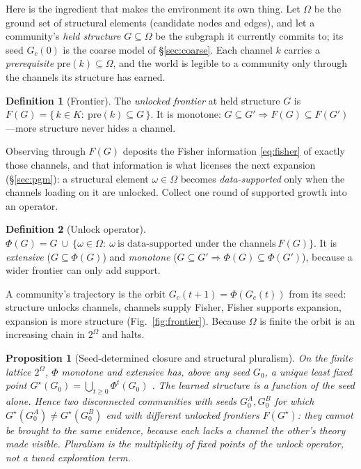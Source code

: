 \documentclass[11pt]{article}
\newcommand{\Prereq}{\mathrm{pre}}
\theoremstyle{definition}
\newtheorem{definition}{Definition}
\theoremstyle{plain}
\newtheorem{proposition}{Proposition}
\begin{document}
Here is the ingredient that makes the environment its own thing. Let $\Omega$ be the ground set of
structural elements (candidate nodes and edges), and let a community's \emph{held structure}
$G\subseteq\Omega$ be the subgraph it currently commits to; its seed $G_c(0)$ is the coarse model of
\S\ref{sec:coarse}. Each channel $k$ carries a \emph{prerequisite} $\Prereq(k)\subseteq\Omega$, and
the world is legible to a community only through the channels its structure has earned.

\begin{definition}[Frontier]
The \emph{unlocked frontier} at held structure $G$ is
$F(G)=\{\,k\in K:\ \Prereq(k)\subseteq G\,\}$. It is monotone: $G\subseteq G'\Rightarrow F(G)\subseteq
F(G')$---more structure never hides a channel.
\end{definition}

\noindent Observing through $F(G)$ deposits the Fisher information \eqref{eq:fisher} of exactly those
channels, and that information is what licenses the next expansion (\S\ref{sec:pgm}): a structural
element $\omega\in\Omega$ becomes \emph{data-supported} only when the channels loading on it are
unlocked. Collect one round of supported growth into an operator.

\begin{definition}[Unlock operator]
$\displaystyle \Phi(G)=G\ \cup\ \big\{\omega\in\Omega:\ \omega\ \text{is data-supported under the
channels}\ F(G)\big\}.$ It is \emph{extensive} ($G\subseteq\Phi(G)$) and \emph{monotone}
($G\subseteq G'\Rightarrow\Phi(G)\subseteq\Phi(G')$), because a wider frontier can only add support.
\end{definition}

A community's trajectory is the orbit $G_c(t{+}1)=\Phi(G_c(t))$ from its seed: structure unlocks
channels, channels supply Fisher, Fisher supports expansion, expansion is more structure
(Fig.~\ref{fig:frontier}). Because $\Omega$ is finite the orbit is an increasing
chain in $2^\Omega$ and halts.

\begin{proposition}[Seed-determined closure and structural pluralism]
\label{prop:fix}
On the finite lattice $2^\Omega$, $\Phi$ monotone and extensive has, above any seed $G_0$, a unique
least fixed point $G^\star(G_0)=\bigcup_{t\ge0}\Phi^t(G_0)$ \citep[Knaster--Tarski;][]{tarski1955}.
The learned structure is a function of the seed alone. Hence two disconnected communities with seeds
$G_0^A,G_0^B$ for which $G^\star(G_0^A)\neq G^\star(G_0^B)$ end with different unlocked frontiers
$F(G^\star)$: they cannot be brought to the same evidence, because each lacks a channel the other's
theory made visible. Pluralism is the \emph{multiplicity of fixed points of the unlock operator}, not
a tuned exploration term.
\end{proposition}
\end{document}
